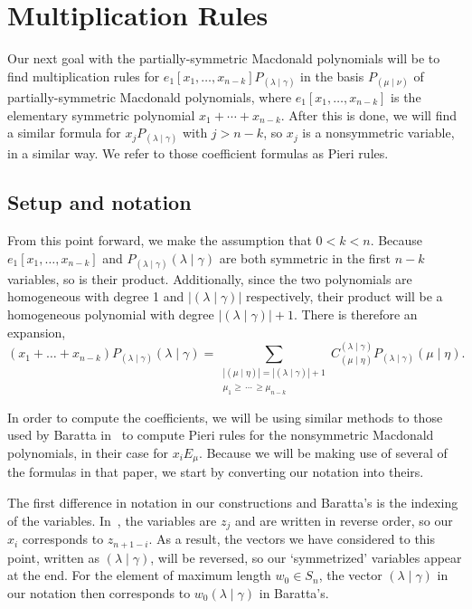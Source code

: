 \documentclass[ALCO]{cedram}
\newcommand{\PP}{P_{(\lambda \mid \gamma)}}
\newcommand{\munu}{{(\mu \mid \nu)}}
\newcommand{\nudom}{{( \lambda \mid \gamma )}}
\newcommand{\lambdagamma}{{\nudom}}
\newcommand{\mueta}{{(\mu \mid \eta)}}
\begin{document}
\section{Multiplication Rules}\label{ElementaryMultiplication}

Our next goal with the partially-symmetric Macdonald polynomials will be to find multiplication rules for $e_1[x_1,\dotsc, x_{n-k}] P_{\lambdagamma}$ in the basis $P_{\munu}$ of partially-symmetric Macdonald polynomials, where $e_1[x_1,\dotsc, x_{n-k}]$ is the elementary symmetric polynomial $x_1+ \dotsm + x_{n-k}$. After this is done, we will find a similar formula for $x_j \PP$ with $j>n-k$, so $x_j$ is a nonsymmetric variable, in a similar way. We refer to those coefficient formulas as Pieri rules.


	\subsection{Setup and notation}
From this point forward, we make the assumption that $0<k<n$. Because $e_1[x_1, \dotsc, x_{n-k}]$ and $\PP{\lambdagamma}$ are both symmetric in the first $n-k$ variables, so is their product. Additionally, since the two polynomials are homogeneous with degree 1 and $|\lambdagamma|$ respectively, their product will be a homogeneous polynomial with degree $|\lambdagamma|+1$. There is therefore an expansion,
\begin{equation}\label{finalexpansion} (x_{1} + \dots + x_{n-k}) \PP{\lambdagamma} =  \sum_{\substack{|\mueta| = |\lambdagamma| + 1 \\ \mu_1 \geq \, \dotsm \, \geq \mu_{n-k}}}  C^{\lambdagamma}_{\mueta} \PP{\mueta}.  \end{equation}

In order to compute the coefficients, we will be using similar methods to those used by Baratta in~\cite{MR2525842} to compute Pieri rules for the nonsymmetric Macdonald polynomials, in their case for $x_i E_\mu$. Because we will be making use of several of the formulas in that paper, we start by converting our notation into theirs.

The first difference in notation in our constructions and Baratta's is the indexing of the variables. In~\cite{MR2525842}, the variables are $z_j$ and are written in reverse order, so our $x_i$ corresponds to $z_{n+1-i}$. As a result, the vectors we have considered to this point, written as $\lambdagamma$, will be reversed, so our `symmetrized' variables appear at the end. For the element of maximum length $w_0 \in S_n$, the vector $\lambdagamma$ in our notation then corresponds to $w_0\lambdagamma$ in Baratta's.
\end{document}
